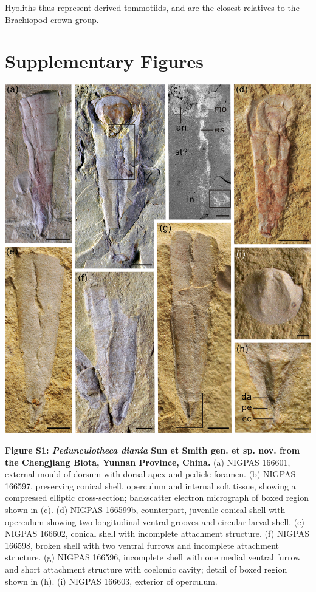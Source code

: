 \documentclass[openany]{book}
\theoremstyle{definition}
\theoremstyle{definition}
\theoremstyle{definition}
\theoremstyle{remark}
\begin{document}
\begin{description}
Hyoliths thus represent derived tommotiids, and are the closest
relatives to the Brachiopod crown group.
\end{description}

\hypertarget{supplementary-figures}{%
\chapter{Supplementary Figures}\label{supplementary-figures}}

\newpage

\begin{center}\includegraphics[width=0.8\linewidth]{images/image1} \end{center}

\textbf{Figure S1: \emph{Pedunculotheca diania} Sun et Smith gen. et sp.
nov. from the Chengjiang Biota, Yunnan Province, China.} (a) NIGPAS
166601, external mould of dorsum with dorsal apex and pedicle foramen.
(b) NIGPAS 166597, preserving conical shell, operculum and internal soft
tissue, showing a compressed elliptic cross-section; backscatter
electron micrograph of boxed region shown in (c). (d) NIGPAS 166599b,
counterpart, juvenile conical shell with operculum showing two
longitudinal ventral grooves and circular larval shell. (e) NIGPAS
166602, conical shell with incomplete attachment structure. (f) NIGPAS
166598, broken shell with two ventral furrows and incomplete attachment
structure. (g) NIGPAS 166596, incomplete shell with one medial ventral
furrow and short attachment structure with coelomic cavity; detail of
boxed region shown in (h). (i) NIGPAS 166603, exterior of operculum.
\end{document}
